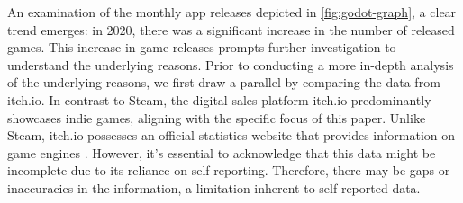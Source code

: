 An examination of the monthly app releases depicted in \autoref{fig:godot-graph}, a clear trend emerges: in 2020, there was a significant increase in the number of released games.
This increase in game releases prompts further investigation to understand the underlying reasons.
Prior to conducting a more in-depth analysis of the underlying reasons, we first draw a parallel by comparing the data from itch.io.
In contrast to Steam, the digital sales platform itch.io predominantly showcases indie games, aligning with the specific focus of this paper.
Unlike Steam, itch.io possesses an official statistics website that provides information on game engines \cite{itchio-engines}.
However, it's essential to acknowledge that this data might be incomplete due to its reliance on self-reporting.
Therefore, there may be gaps or inaccuracies in the information, a limitation inherent to self-reported data. \\

